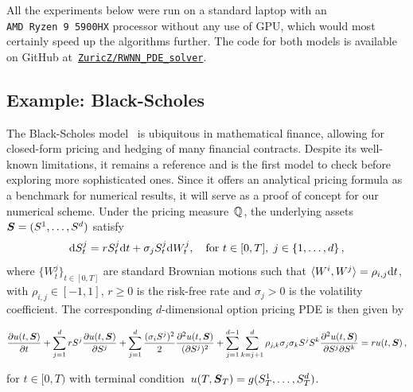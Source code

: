 \sloppy All the experiments below were run on a standard laptop with an \texttt{AMD~Ryzen~9~5900HX} processor without any use of GPU, which would most certainly speed up the algorithms further. The code for both models is available on GitHub at~\href{https://github.com/ZuricZ/RWNN_PDE_solver}{\texttt{ZuricZ/RWNN\_PDE\_solver}}.


\subsection{Example: Black-Scholes}
The Black-Scholes model~\cite{Black1973TheLiabilities} is ubiquitous in mathematical finance, allowing for closed-form pricing and hedging of many financial contracts.
Despite its well-known limitations, it remains a reference and is the first model to check before exploring more sophisticated ones. 
Since it offers an analytical pricing formula as a benchmark for numerical results, it will serve as a proof of concept for our numerical scheme.
Under the pricing measure~$\mathbb{Q}$, the underlying assets $\boldsymbol{S} = (S^1,\ldots, S^d)$ satisfy
\begin{equation}
    \mathrm{d} S^j_t = r S^j_t \mathrm{d} t + \sigma_j S^j_t \mathrm{d} W^j_t, \quad \text{for } t\in[0,T],\; j\in\{1,\dots,d\}\,,
\end{equation}
where $\{W^j_t\}_{t\in[0,T]}$ are standard Brownian motions such that $\langle W^i, W^j \rangle = \rho_{i,j}\mathrm{d} t$, 
with $\rho_{i,j}\in [-1,1]$, $r\geq 0$ is the risk-free rate and $\sigma_j>0$ is the volatility coefficient. 
The corresponding $d$-dimensional option pricing PDE is then given by
\begin{small}
\begin{equation*}
\frac{\partial u(t,\boldsymbol{S})}{\partial t}+\sum_{j=1}^d r S^j \frac{\partial u(t,\boldsymbol{S})}{\partial S^j} + \sum_{j=1}^d \frac{(\sigma_i S^j)^2}{2} \frac{\partial^2 u(t,\boldsymbol{S})}{(\partial S^j)^2} + \sum_{j=1}^{d-1} \sum_{k=j+1}^d \rho_{j, k} \sigma_j \sigma_k S^j S^k \frac{\partial^2 u(t,\boldsymbol{S})}{\partial S^j \partial S^k} = r u(t,\boldsymbol{S})\,,
\end{equation*}
\end{small}
for $t\in[0,T)$ with terminal condition~$u(T,\boldsymbol{S}_T) = g(S^1_T,\dots, S^d_T)$.

